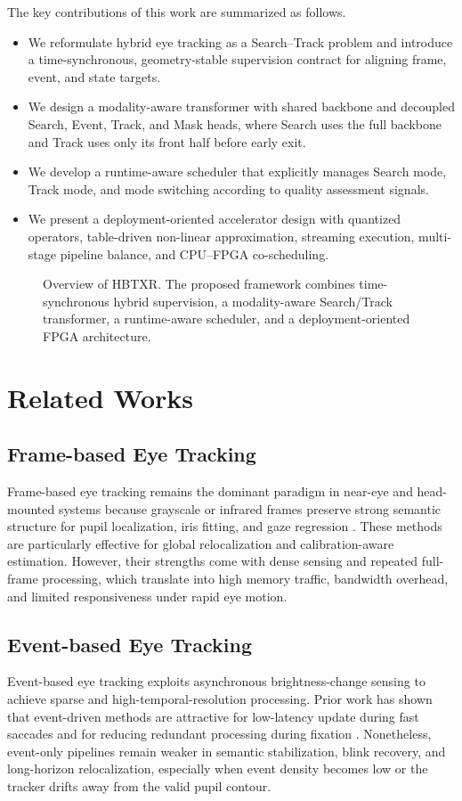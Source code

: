 \documentclass[journal]{IEEEtran}
\newcommand{\placeholderfigure}[2]{%
  \fbox{\parbox[c][#2][c]{#1}{\centering\vspace{2mm}\textbf{Figure placeholder}\\Final artwork pending\vspace{2mm}}}}
\begin{document}
The key contributions of this work are summarized as follows.
\begin{itemize}
    \item We reformulate hybrid eye tracking as a Search--Track problem and introduce a time-synchronous, geometry-stable supervision contract for aligning frame, event, and state targets.
    \item We design a modality-aware transformer with shared backbone and decoupled Search, Event, Track, and Mask heads, where Search uses the full backbone and Track uses only its front half before early exit.
    \item We develop a runtime-aware scheduler that explicitly manages Search mode, Track mode, and mode switching according to quality assessment signals.
    \item We present a deployment-oriented accelerator design with quantized operators, table-driven non-linear approximation, streaming execution, multi-stage pipeline balance, and CPU--FPGA co-scheduling.
\end{itemize}

\begin{figure}[t]
\centering
\placeholderfigure{0.93\textwidth}{2.0in}
\caption{Overview of HBTXR. The proposed framework combines time-synchronous hybrid supervision, a modality-aware Search/Track transformer, a runtime-aware scheduler, and a deployment-oriented FPGA architecture.}
\label{fig:overview}
\end{figure}

\section{Related Works}
\subsection{Frame-based Eye Tracking}
Frame-based eye tracking remains the dominant paradigm in near-eye and head-mounted systems because grayscale or infrared frames preserve strong semantic structure for pupil localization, iris fitting, and gaze regression \cite{ref1,ref3}. These methods are particularly effective for global relocalization and calibration-aware estimation. However, their strengths come with dense sensing and repeated full-frame processing, which translate into high memory traffic, bandwidth overhead, and limited responsiveness under rapid eye motion.

\subsection{Event-based Eye Tracking}
Event-based eye tracking exploits asynchronous brightness-change sensing to achieve sparse and high-temporal-resolution processing. Prior work has shown that event-driven methods are attractive for low-latency update during fast saccades and for reducing redundant processing during fixation \cite{ref4,ref5,ref6}. Nonetheless, event-only pipelines remain weaker in semantic stabilization, blink recovery, and long-horizon relocalization, especially when event density becomes low or the tracker drifts away from the valid pupil contour.
\end{document}
